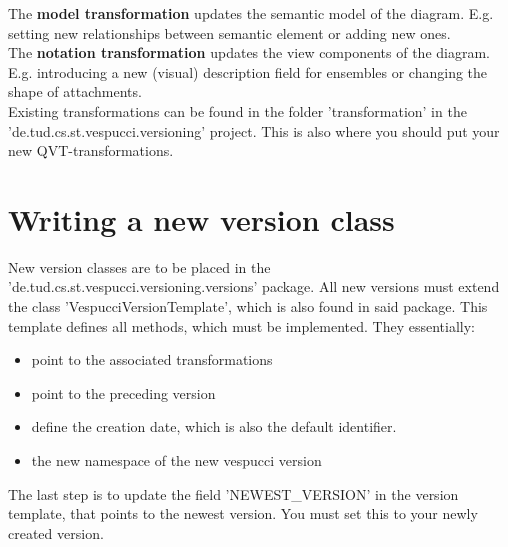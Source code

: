 \documentclass[12pt,a4paper,oneside]{report}
\begin{document}
The \textbf{model transformation} updates the semantic model of the diagram. E.g. setting new relationships between semantic element or adding new ones.\\

The \textbf{notation transformation} updates the view components of the diagram. E.g. introducing a new (visual) description field for ensembles or changing the shape of attachments.\\

Existing transformations can be found in the folder 'transformation' in the 'de.tud.cs.st.vespucci.versioning' project. This is also where you should put your new QVT-transformations.

\section*{Writing a new version class}
New version classes are to be placed in the 'de.tud.cs.st.vespucci.versioning.versions' package. All new versions must extend the class 'VespucciVersionTemplate', which is also found in said package. This template defines all methods, which must be implemented. They essentially: 
\begin{itemize}
	\item point to the associated transformations
	\item point to the preceding version
	\item define the creation date, which is also the default identifier.
	\item the new namespace of the new vespucci version
\end{itemize}
\medskip
The last step is to update the field 'NEWEST\_VERSION' in the version template, that points to the newest version. You must set this to your newly created version.
\end{document}
